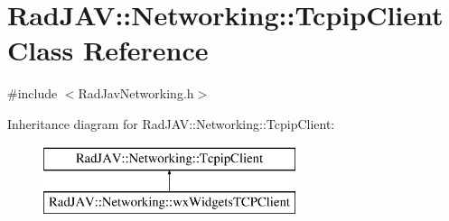 \hypertarget{class_rad_j_a_v_1_1_networking_1_1_tcpip_client}{}\section{Rad\+J\+AV\+:\+:Networking\+:\+:Tcpip\+Client Class Reference}
\label{class_rad_j_a_v_1_1_networking_1_1_tcpip_client}


{\ttfamily \#include $<$Rad\+Jav\+Networking.\+h$>$}

Inheritance diagram for Rad\+J\+AV\+:\+:Networking\+:\+:Tcpip\+Client\+:\begin{figure}[H]
\begin{center}
\leavevmode
\includegraphics[height=2.000000cm]{class_rad_j_a_v_1_1_networking_1_1_tcpip_client}
\end{center}
\end{figure}

